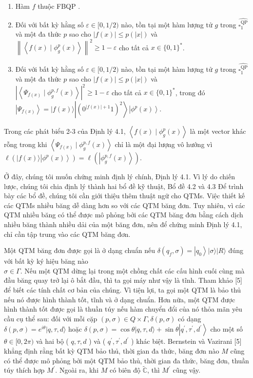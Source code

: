 \documentclass[10pt]{article}
\begin{document}
\begin{enumerate}
  \item Hàm $f$ thuộc FBQP .
  \item Đối với bất kỳ hằng số $\varepsilon \in[0,1 / 2)$ nào, tồn tại một hàm lượng tử $g$ trong $\widehat{\square_{1}^{\mathrm{QP}}}$ và một đa thức $p$ sao cho $|f(x)| \leq p(|x|)$ và $\left\|\left\langle f(x) \mid \phi_{g}^{p}(x)\right\rangle\right\|^{2} \geq 1-\varepsilon$ cho tất cả $x \in\{0,1\}^{*}$.
  \item Đối với bất kỳ hằng số $\varepsilon \in[0,1 / 2)$ nào, tồn tại một hàm lượng tử $g$ trong $\widehat{\square_{1}^{\mathrm{QP}}}$ và một đa thức $p$ sao cho $|f(x)| \leq p(|x|)$ và $\left|\left\langle\Psi_{f(x)} \mid \phi_{g}^{p, f}(x)\right\rangle\right|^{2} \geq 1-\varepsilon$ cho tất cả $x \in\{0,1\}^{*}$, trong đó $\left|\Psi_{f(x)}\right\rangle= |f(x)\rangle\left|\left(0^{|f(x)|+1} 1\right)^{2}\right\rangle\left|\phi^{p}(x)\right\rangle$.
\end{enumerate}

Trong các phát biểu 2-3 của Định lý 4.1, $\left\langle f(x) \mid \phi_{g}^{p}(x)\right\rangle$ là một vector khác rỗng trong khi $\left\langle\Psi_{f(x)} \mid \phi_{g}^{p, f}(x)\right\rangle$ chỉ là một đại lượng vô hướng vì $\ell\left(|f(x)\rangle\left|\phi^{p}(x)\right\rangle\right)=\ell\left(\left|\phi_{g}^{p, f}(x)\right\rangle\right)$.

Ở đây, chúng tôi muốn chứng minh định lý chính, Định lý 4.1. Vì lý do chiến lược, chúng tôi chia định lý thành hai bổ đề kỹ thuật, Bổ đề 4.2 và 4.3 Để trình bày các bổ đề, chúng tôi cần giới thiệu thêm thuật ngữ cho QTMs. Việc thiết kế các QTMs nhiều băng dễ dàng hơn so với các QTM băng đơn. Tuy nhiên, vì các QTM nhiều băng có thể được mô phỏng bởi các QTM băng đơn bằng cách dịch nhiều băng thành nhiều dải của một băng đơn, nên để chứng minh Định lý 4.1, chỉ cần tập trung vào các QTM băng đơn.

Một QTM băng đơn được gọi là ở dạng chuẩn nếu $\delta\left(q_{f}, \sigma\right)=\left|q_{0}\right\rangle|\sigma\rangle|R\rangle$ đúng với bất kỳ ký hiệu băng nào\\
$\sigma \in \Gamma$. Nếu một QTM dừng lại trong một chồng chất các cấu hình cuối cùng mà đầu băng quay trở lại ô bắt đầu, thì ta gọi máy như vậy là tĩnh. Tham khảo [5] để biết các tính chất cơ bản của chúng. Vì tiện lợi, ta gọi một QTM là bảo thủ nếu nó được hình thành tốt, tĩnh và ở dạng chuẩn. Hơn nữa, một QTM được hình thành tốt được gọi là thuần túy nếu hàm chuyển đổi của nó thỏa mãn yêu cầu cụ thể sau: đối với mỗi cặp $(p, \sigma) \in Q \times \Gamma, \delta(p, \sigma)$ có dạng $\delta(p, \sigma)=e^{i \theta}|q, \tau, d\rangle$ hoặc $\delta(p, \sigma)=\cos \theta|q, \tau, d\rangle+\sin \theta\left|q^{\prime}, \tau^{\prime}, d^{\prime}\right\rangle$ cho một số $\theta \in[0,2 \pi)$ và hai bộ ( $q, \tau, d$ ) và ( $q^{\prime}, \tau^{\prime}, d^{\prime}$ ) khác biệt. Bernstein và Vazirani [5] khẳng định rằng bất kỳ QTM bảo thủ, thời gian đa thức, băng đơn nào $M$ cũng có thể được mô phỏng bởi một QTM bảo thủ, thời gian đa thức, băng đơn, thuần túy thích hợp $M^{\prime}$. Ngoài ra, khi $M$ có biên độ $\tilde{\mathbb{C}}$, thì $M^{\prime}$ cũng vậy.
\end{document}
